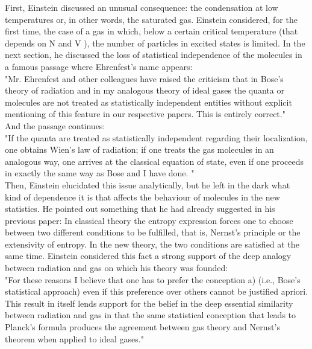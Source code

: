 \documentclass[12pt, letterpaper]{article}
\begin{document}
    First, Einstein discussed an unusual consequence: the condensation at low
    temperatures or, in other words, the saturated gas. Einstein considered, for the
    first time, the case of a gas in which, below a certain critical temperature (that
    depends on N and V ), the number of particles in excited states is limited. In the
    next section, he discussed the loss of statistical independence of the molecules
    in a famous passage where Ehrenfest’s name appears: \\ 
    "Mr. Ehrenfest and other colleagues have raised the criticism that in
    Bose’s theory of radiation and in my analogous theory of ideal gases
    the quanta or molecules are not treated as statistically independent
    entities without explicit mentioning of this feature in our respective
    papers. This is entirely correct." \\ 
    And the passage continues: \\
    "If the quanta are treated as statistically independent regarding their
    localization, one obtains Wien’s law of radiation; if one treats the gas
    molecules in an analogous way, one arrives at the classical equation
    of state, even if one proceeds in exactly the same way as Bose and I
    have done. " \\ 
    Then, Einstein elucidated this issue analytically, but he left in the dark
    what kind of dependence it is that affects the behaviour of molecules in the
    new statistics. He pointed out something that he had already suggested in his
    previous paper: In classical theory the entropy expression forces one to choose
    between two different conditions to be fulfilled, that is, Nernst’s principle or the
    extensivity of entropy. In the new theory, the two conditions are satisfied at the
    same time. Einstein considered this fact a strong support of the deep analogy
    between radiation and gas on which his theory was founded: \\ 

    "For these reasons I believe that one has to prefer the conception a)
    (i.e., Bose’s statistical approach) even if this preference over others
    cannot be justified apriori. This result in itself lends support for the
    belief in the deep essential similarity between radiation and gas in
    that the same statistical conception that leads to Planck’s formula
    produces the agreement between gas theory and Nernst’s theorem
    when applied to ideal gases." \\ 
\end{document}
